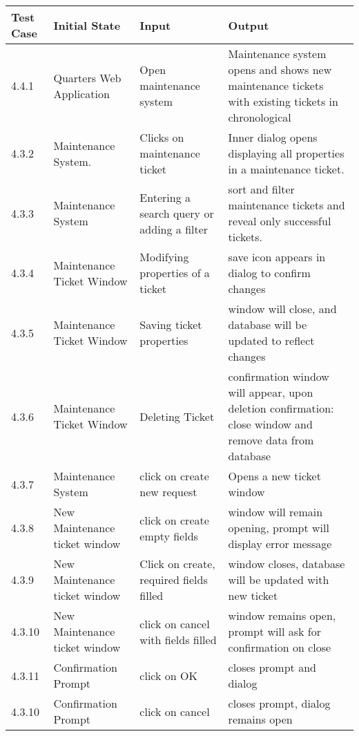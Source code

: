 \documentclass[12pt]{article}
\begin{document}
\begin{longtable}{|p{2cm}|p{3cm}|p{5cm}|p{5cm}|}
\hline
\textbf{Test Case}  & \textbf{Initial State} & \textbf{Input} & \textbf{Output} \\ \hline
4.4.1 & Quarters Web Application & Open maintenance system & Maintenance system opens and shows new maintenance tickets with existing tickets in chronological\\ 
\hline
4.3.2 & Maintenance System. & Clicks on maintenance ticket & Inner dialog opens displaying all properties in a maintenance ticket. \\
\hline
4.3.3 & Maintenance System & Entering a search query or adding a filter & sort and filter maintenance tickets and reveal only successful tickets. \\
\hline
4.3.4 & Maintenance Ticket Window & Modifying properties of a ticket & save icon appears in dialog to confirm changes\\
\hline
4.3.5 & Maintenance Ticket Window & Saving ticket properties & window will close, and database will be updated to reflect changes\\
\hline
4.3.6 & Maintenance Ticket Window & Deleting Ticket & confirmation window will appear, upon deletion confirmation: close window and remove data from database\\
\hline
4.3.7 & Maintenance System & click on create new request & Opens a new ticket window\\
\hline
4.3.8 & New Maintenance ticket window & click on create empty fields & window will remain opening, prompt will display error message\\
\hline
4.3.9 & New Maintenance ticket window & Click on create, required fields filled & window closes, database will be updated with new ticket\\
\hline
4.3.10 & New Maintenance ticket window & click on cancel with fields filled & window remains open, prompt will ask for confirmation on close\\
\hline
4.3.11 & Confirmation Prompt & click on OK & closes prompt and dialog \\
\hline
4.3.10 & Confirmation Prompt & click on cancel & closes prompt, dialog remains open\\
\hline
\end{longtable}

\end{document}
